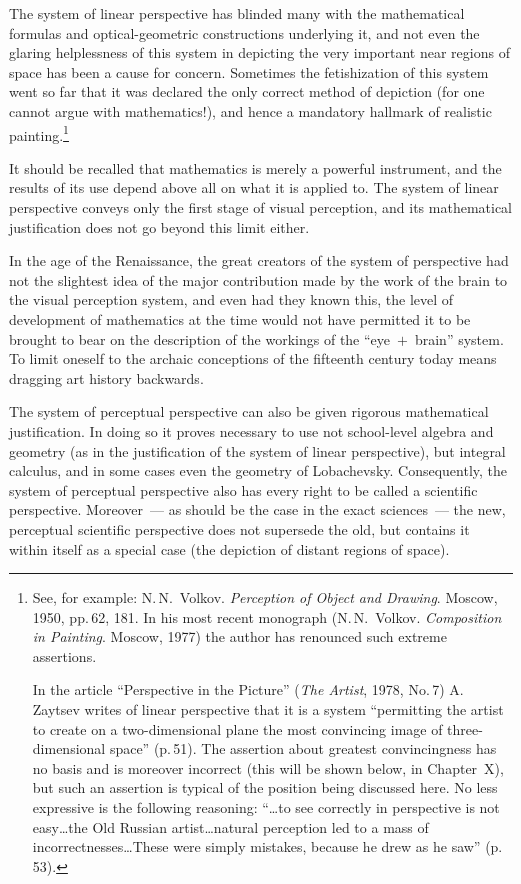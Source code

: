 The system of linear perspective has blinded many with the mathematical formulas and
optical-geometric constructions underlying it, and not even the glaring helplessness of
this system in depicting the very important near regions of space has been a cause for
concern.  Sometimes the fetishization of this system went so far that it was declared the
only correct method of depiction (for one cannot argue with mathematics!), and hence
a mandatory hallmark of realistic painting.\footnote{%
  See, for example: N.\,N.~Volkov. \emph{Perception of Object and Drawing}.
  Moscow, 1950, pp.\,62, 181.  In his most recent monograph (N.\,N.~Volkov.
  \emph{Composition in Painting}. Moscow, 1977) the author has renounced such
  extreme assertions.

  In the article ``Perspective in the Picture'' (\emph{The Artist}, 1978, No.\,7)
  A.\,Zaytsev writes of linear perspective that it is a system ``permitting the artist to
  create on a two-dimensional plane the most convincing image of three-dimensional
  space'' (p.\,51).  The assertion about greatest convincingness has no basis and is
  moreover incorrect (this will be shown below, in Chapter~X\@), but such an assertion
  is typical of the position being discussed here.  No less expressive is the following
  reasoning: ``\ldots to see correctly in perspective is not easy\ldots the Old Russian
  artist\ldots natural perception led to a mass of incorrectnesses\ldots These were
  simply mistakes, because he drew as he saw'' (p.\,53).}


It should be recalled that mathematics is merely a powerful instrument, and the results
of its use depend above all on what it is applied to.  The system of linear perspective
conveys only the first stage of visual perception, and its mathematical justification does
not go beyond this limit either.

In the age of the Renaissance, the great creators of the system of perspective had not
the slightest idea of the major contribution made by the work of the brain to the visual
perception system, and even had they known this, the level of development of
mathematics at the time would not have permitted it to be brought to bear on the
description of the workings of the ``eye~$+$~brain'' system.  To limit oneself to the
archaic conceptions of the fifteenth century today means dragging art history backwards.

The system of perceptual perspective can also be given rigorous mathematical
justification.  In doing so it proves necessary to use not school-level algebra and
geometry (as in the justification of the system of linear perspective), but integral
calculus, and in some cases even the geometry of Lobachevsky.  Consequently, the
system of perceptual perspective also has every right to be called a scientific
perspective.  Moreover~--- as should be the case in the exact sciences~--- the new,
perceptual scientific perspective does not supersede the old, but contains it within
itself as a special case (the depiction of distant regions of space).

